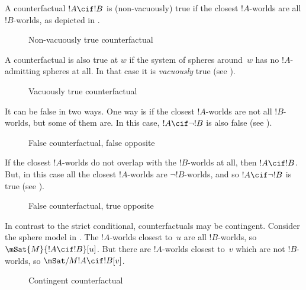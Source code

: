 \documentclass[../../../include/open-logic-section]{subfiles}
\begin{document}

A counterfactual $!A \cif !B$ is (non-vacuously) true if the closest
$!A$-worlds are all $!B$-worlds, as depicted in .
\begin{figure}
\centering
{}
\caption{Non-vacuously true counterfactual}
\end{figure}
A counterfactual is also true at $w$ if the system of spheres
around~$w$ has no $!A$-admitting spheres at all. In that case it is
\emph{vacuously} true (see  ).
\begin{figure}
\centering
{}
\caption{Vacuously true counterfactual}
\end{figure}

It can be false in two ways. One way is if the closest $!A$-worlds are
not all $!B$-worlds, but some of them are. In this case, $!A \cif
\lnot !B$ is also false (see ).
\begin{figure}
\centering
{}
\caption{False counterfactual, false opposite}
\end{figure}
If the closest $!A$-worlds do not overlap with the $!B$-worlds at all,
then $!A \cif !B$. But, in this case all the closest $!A$-worlds are
$\lnot !B$-worlds, and so $!A \cif \lnot !B$ is true (see
).
\begin{figure}
\centering
{}
\caption{False counterfactual, true opposite}
\end{figure}

In contrast to the strict conditional, counterfactuals may be
contingent. Consider the sphere model in . The
$!A$-worlds closest to~$u$ are all $!B$-worlds, so $\mSat{M}{!A \cif
  !B}[u]$. But there are $!A$-worlds closest to~$v$ which are not
$!B$-worlds, so $\mSat/{M}{!A \cif !B}[v]$.
\begin{figure}
\centering
{}
\caption{Contingent counterfactual}
\end{figure}
\end{document}
